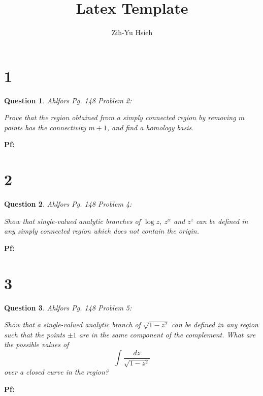 \documentclass{article}
\title{Latex Template}
\author{Zih-Yu Hsieh}
\newtheorem{question}{Question}
\begin{document}
\maketitle

\section*{1}
\begin{myBox}[]{}
    \begin{question}
        Ahlfors Pg. 148 Problem 2:

        Prove that the region obtained from a simply connected region by
        removing $m$ points has the connectivity $m + 1$, and find a homology basis.
    \end{question}
\end{myBox}

\textbf{Pf:}

\break

\section*{2}
\begin{myBox}[]{}
    \begin{question}
        Ahlfors Pg. 148 Problem 4:

        Show that single-valued analytic branches of $\log z$, $z^\alpha$ and $z^z$ can be
        defined in any simply connected region which does not contain the origin.
    \end{question}
\end{myBox}

\textbf{Pf:}

\break

\section*{3}
\begin{myBox}[]{}
    \begin{question}
        Ahlfors Pg. 148 Problem 5:

        Show that a single-valued analytic branch of $\sqrt{1-z^2}$ can be
        defined in any region such that the points $\pm 1$ are in the same component
        of the complement. What are the possible values of
        $$\int\frac{dz}{\sqrt{1-z^2}}$$
        over a closed curve in the region?
    \end{question}
\end{myBox}

\textbf{Pf:}
\end{document}
